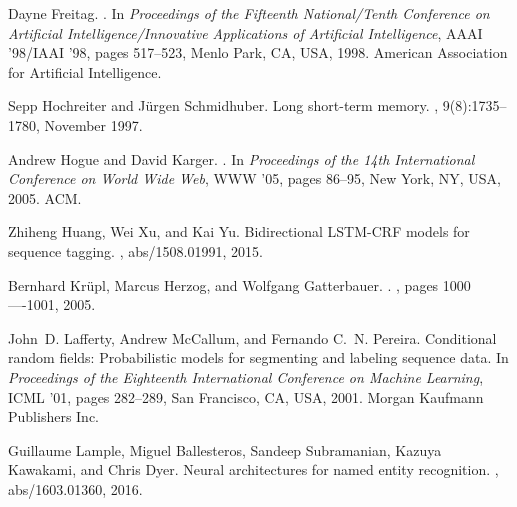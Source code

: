 \documentclass{nle}
\begin{document}
\begin{thebibliography}{}
Dayne Freitag.
.
\newblock In {\em Proceedings of the Fifteenth National/Tenth Conference on
  Artificial Intelligence/Innovative Applications of Artificial Intelligence},
  AAAI '98/IAAI '98, pages 517--523, Menlo Park, CA, USA, 1998. American
  Association for Artificial Intelligence.

Sepp Hochreiter and J\"{u}rgen Schmidhuber.
\newblock Long short-term memory.
, 9(8):1735--1780, November 1997.

Andrew Hogue and David Karger.
.
\newblock In {\em Proceedings of the 14th International Conference on World
  Wide Web}, WWW '05, pages 86--95, New York, NY, USA, 2005. ACM.

Zhiheng Huang, Wei Xu, and Kai Yu.
\newblock Bidirectional {LSTM-CRF} models for sequence tagging.
, abs/1508.01991, 2015.

Bernhard Kr{\"{u}}pl, Marcus Herzog, and Wolfgang Gatterbauer.
.
, pages 1000----1001, 2005.

John~D. Lafferty, Andrew McCallum, and Fernando C.~N. Pereira.
\newblock Conditional random fields: Probabilistic models for segmenting and
  labeling sequence data.
\newblock In {\em Proceedings of the Eighteenth International Conference on
  Machine Learning}, ICML '01, pages 282--289, San Francisco, CA, USA, 2001.
  Morgan Kaufmann Publishers Inc.

Guillaume Lample, Miguel Ballesteros, Sandeep Subramanian, Kazuya Kawakami, and
  Chris Dyer.
\newblock Neural architectures for named entity recognition.
, abs/1603.01360, 2016.


\end{thebibliography}
\end{document}
